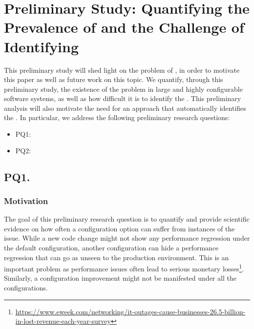 
\section{Preliminary Study: Quantifying the Prevalence of \inconsistent and the Challenge of Identifying \inconsistent } \label{sec:pq-results}

This preliminary study will shed light on the problem of \inconsistent, in order to motivate this paper as well as future work on this topic. We quantify, through this preliminary study, the existence of the \inconsistent problem in large and highly configurable software systems, as well as how difficult it is to identify the \inconsistent. 
This preliminary analysis will also motivate the need for an approach that automatically identifies the \inconsistent. 
In particular, we address the following preliminary research questions: 

\begin{itemize}
    \item[] PQ1: \PQI
    \item[] PQ2: \PQII
\end{itemize}

\subsection*{\textbf{PQ1. \PQI}}
\label{sec:rq1}
\subsubsection*{Motivation}
The goal of this preliminary research question is to quantify and provide scientific evidence on how often a configuration option can suffer from instances of the \inconsistent issue. %
While a new code change might not show any performance regression under the default configuration, another configuration can hide a performance regression that can go as unseen to the production environment. This is an important problem as performance issues often lead to serious monetary losses\footnote{\url{https://www.eweek.com/networking/it-outages-cause-businesses-26.5-billion-in-lost-revenue-each-year-survey}}. Similarly, a configuration improvement might not be manifested under all the configurations.  %

